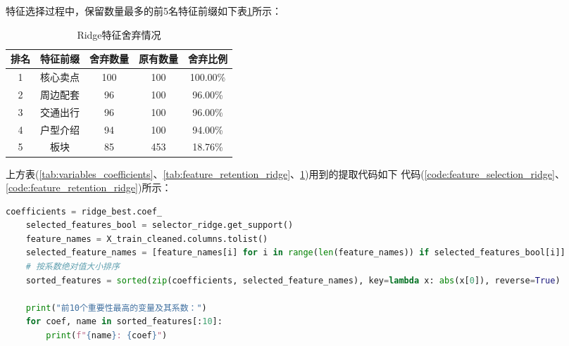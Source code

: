 \documentclass[
    report,     %
    oneside,    %
    UTF8,       %
    zihao=-4    %
]{config} %
\begin{document}
特征选择过程中，保留数量最多的前5名特征前缀如下表\ref{tab:feature_discarding_ridge}所示：

\begin{table}[htbp]
    \centering
    \caption{Ridge特征舍弃情况}
    \label{tab:feature_discarding_ridge}
    \begin{tabular}{ccccc}
        \toprule
        \textbf{排名} & \textbf{特征前缀} & \textbf{舍弃数量} & \textbf{原有数量} & \textbf{舍弃比例} \\
        \midrule
        1 & 核心卖点 & 100 & 100 & 100.00\% \\
        2 & 周边配套 & 96 & 100 & 96.00\% \\
        3 & 交通出行 & 96 & 100 & 96.00\% \\
        4 & 户型介绍 & 94 & 100 & 94.00\% \\
        5 & 板块 & 85 & 453 & 18.76\% \\
        \bottomrule
    \end{tabular}
\end{table}

上方表(\ref{tab:variables_coefficients}、\ref{tab:feature_retention_ridge}、\ref{tab:feature_discarding_ridge})用到的提取代码如下
代码(\ref{code:feature_selection_ridge}、\ref{code:feature_retention_ridge})所示：
\begin{lstlisting}[label=code:feature_selection_ridge, language=Python, caption=Ridge：重要性排名前10的变量及其系数]
    coefficients = ridge_best.coef_
    selected_features_bool = selector_ridge.get_support()
    feature_names = X_train_cleaned.columns.tolist()
    selected_feature_names = [feature_names[i] for i in range(len(feature_names)) if selected_features_bool[i]]
    # 按系数绝对值大小排序
    sorted_features = sorted(zip(coefficients, selected_feature_names), key=lambda x: abs(x[0]), reverse=True)
    
    print("前10个重要性最高的变量及其系数：")
    for coef, name in sorted_features[:10]:
        print(f"{name}: {coef}")
\end{lstlisting}
\end{document}

